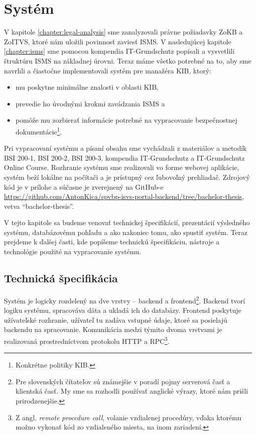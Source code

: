 \chapter{Systém}

V kapitole \ref{chapter:legal-analysis} sme zanalyzovali právne požiadavky ZoKB a ZoITVS, ktoré nám uložili povinnosť
zaviesť ISMS. V nasledujúcej kapitole \ref{chapter:isms} sme pomocou kompendia IT-Grundschutz\cite{GSK} popísali a
vysvetlili štruktúru ISMS na základnej úrovni. Teraz máme všetko potrebné na to, aby sme navrhli a čiastočne implementovali 
systém pre manažéra KIB, ktorý:

\begin{itemize}
  \item mu poskytne minimálne znalosti v oblasti KIB,
  \item prevedie ho úvodnými krokmi zavádzania ISMS a
  \item pomôže mu zozbierať informácie potrebné na vypracovanie bezpečnostnej dokumentácie\footnote{Konkrétne politiky KIB.}.
\end{itemize}

Pri vypracovaní systému a písaní obsahu sme vychádzali z materiálov a metodík  BSI 200-1\cite{BSI1}, BSI 200-2\cite{BSI2},
BSI 200-3\cite{BSI3}, kompendia IT-Grundschutz\cite{GSK} a IT-Grundschutz Online Course\cite{GSK-OC}. Rozhranie systému
sme realizovali vo forme webovej aplikácie, systém beží lokálne na počítači a je prístupný cez ľubovoľný prehliadač.
Zdrojový kód je v prílohe a súčasne je zverejnený na GitHub-e
\url{https://github.com/AntonKica/spvbp-isvs-portal-backend/tree/bachelor-thesis}, vetva \enquote{bachelor-thesis}.

V tejto kapitole sa budeme venovať technickej špecifikácií, prezentácií výsledného systému, databázovému pohľadu a
ako nakoniec tomu, ako spustiť systém. Teraz prejdeme k ďalšej časti, kde popíšeme technickú špecifikáciu, nástroje a
technológie použité na vypracovanie systému.

\section{Technická špecifikácia}

Systém je logicky rozdelený na dve vrstvy -- backend a frontend\footnote{Pre slovenských čítateľov sú známejšie v poradí pojmy
serverová časť a klientská časť. My sme sa rozhodli používať anglické výrazy, ktoré nám prišli prirodzenejšie.}. Backend
tvorí logiku systému, spracováva dáta a ukladá ich do databázy. Frontend poskytuje užívateľské rozhranie, užívateľ tu zadáva
vstupné údaje, ktoré sa posielajú backendu na spracovanie. Komunikácia medzi týmito dvoma vrstvami je realizovaná prostredníctvom
protokolu \acrshort{HTTP} a \acrshort{RPC}\footnote{Z angl. \textit{remote procedure call}, volanie vzdialenej procedúry,
vďaka ktorému možno vykonať kód zo vzdialeného miesta, na inom zariadení.}.

